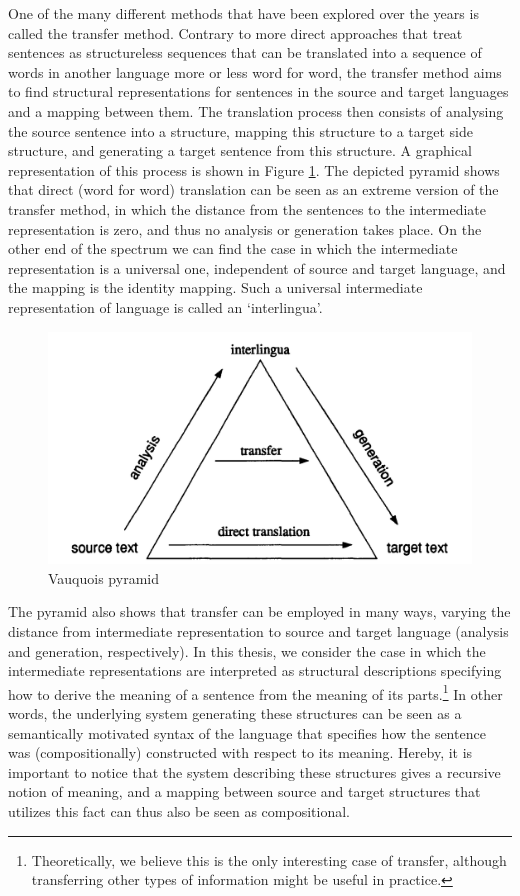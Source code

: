 One of the many different methods that have been explored over the years is called the transfer method. Contrary to more direct approaches that treat sentences as structureless sequences that can be translated into a sequence of words in another language more or less word for word, the transfer method aims to find structural representations for sentences in the source and target languages and a mapping between them. The translation process then consists of analysing the source sentence into a structure, mapping this structure to a target side structure, and generating a target sentence from this structure. A graphical representation of this process is shown in Figure \ref{fig:triangle}. The depicted pyramid shows that direct (word for word) translation can be seen as an extreme version of the transfer method, in which the distance from the sentences to the intermediate representation is zero, and thus no analysis or generation takes place. On the other end of the spectrum we can find the case in which the intermediate representation is a universal one, independent of source and target language, and the mapping is the identity mapping. Such a universal intermediate representation of language is called an `interlingua'. 


\begin{figure}[!ht]
\centering
\includegraphics[scale=0.2]{Graphics/translation_triangle.png}
\caption{Vauquois pyramid}\label{fig:triangle}
\end{figure}

The pyramid also shows that transfer can be employed in many ways, varying the distance from intermediate representation to source and target language (analysis and generation, respectively). In this thesis, we consider the case in which the intermediate representations are interpreted as structural descriptions specifying how to derive the meaning of a sentence from the meaning of its parts.\footnote{Theoretically, we believe this is the only interesting case of transfer, although transferring other types of information might be useful in practice.} In other words, the underlying system generating these structures can be seen as a semantically motivated syntax of the language that specifies how the sentence was (compositionally) constructed with respect to its meaning. Hereby, it is important to notice that the system describing these structures gives a recursive notion of meaning, and a mapping between source and target structures that utilizes this fact can thus also be seen as compositional.

